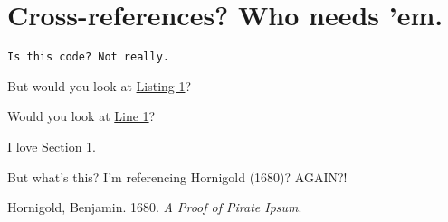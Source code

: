 \hypertarget{me}{%
\section{Cross-references? Who needs 'em.}\label{me}}

\hypertarget{snippet}{%
\label{snippet}}%
\begin{verbatim}
Is this code? Not really.
\end{verbatim}

But would you look at \protect\hyperlink{snippet}{Listing 1}?

Would you look at \protect\hyperlink{snippet.1}{Line 1}?

I love \protect\hyperlink{me}{Section 1}.

But what's this? I'm referencing Hornigold (1680)? AGAIN?!

\hypertarget{refs}{}
\begin{CSLReferences}{1}{0}
\leavevmode{}%
Hornigold, Benjamin. 1680. \emph{A Proof of Pirate Ipsum}.

\end{CSLReferences}
